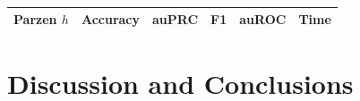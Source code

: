 \documentclass[12pt]{article}
\begin{document}
    \begin{table}[]
    \centering
    \begin{tabular}{|c|c|c|c|c|c|}
    \hline
    \textbf{Parzen $h$} & \textbf{Accuracy} & \textbf{auPRC} & \textbf{F1} &                             \textbf{auROC} & \textbf{Time} \\ \hline
    \end{tabular}
    \caption{}
    \label{table:4}
    \end{table} 
    
	
	\section{Discussion and Conclusions}
	
    
    
    \newpage
    \nocite{*}
     
    
	
\end{document}
